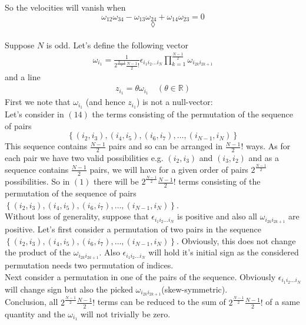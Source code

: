 So the velocities will vanish when$$\omega_{12}\omega_{34}-\omega_{13}\omega_{24}+\omega_{14}\omega_{23}=0$$
$$\lozenge$$\\
Suppose $N$ is odd. Let's define the following vector
\begin{align}
\omega_{i_1}= \frac{1}{2^{\frac{N-1}{2}}\frac{N-1}{2}!}\epsilon_{i_{1} i_{2} \dots i_{N}}\prod_{k=1}^{\frac{N-1}{2}}\omega_{i_{2k} i_{2k+1}}
\end{align}
and a line
\begin{align}
z_{i_1} = \theta \omega_{i_1}\quad (\theta \in \mathbb{R})
\end{align}
First we note that $\omega_{i_1}$ (and hence $z_{i_1}$) is not a null-vector:\\
Let's consider in $(14)$ the terms consisting of the permutation of the sequence of pairs $$\left\{\left( i_2,i_3 \right),\left( i_4,i_5 \right),\left( i_6,i_7\right),\dots ,\left( i_{N-1},i_N \right)\right\}$$ This sequence contains $\frac{N-1}{2}$ pairs and so can be arranged in $\frac{N-1}{2}!$ ways. As for each pair we have two valid possibilities e.g. $\left( i_2,i_3 \right)$ and $\left( i_3,i_2 \right)$ and as a sequence contains $\frac{N-1}{2}$ pairs, we will have for a given order of pairs $2^{\frac{N-1}{2}}$ possibilities. So in $(1)$ there will be $2^{\frac{N-1}{2}}\frac{N-1}{2}!$ terms consisting of the permutation of the sequence of pairs $\left\{\left( i_2,i_3 \right),\left( i_4,i_5 \right),\left( i_6,i_7\right),\dots ,\left( i_{N-1},i_N \right)\right\}$.\\
Without loss of generality, suppose that $\epsilon_{i_{1} i_{2} \dots i_{N}}$ is positive and also all $\omega_{i_{2k} i_{2k+1}}$ are positive.
Let's first consider a permutation of two pairs in the sequence $\left\{\left( i_2,i_3 \right),\left( i_4,i_5 \right),\left( i_6,i_7\right),\dots ,\left( i_{N-1},i_N \right)\right\}$. Obviously, this does not change the product of the $\omega_{i_{2k} i_{2k+1}}$. Also $\epsilon_{i_{1} i_{2} \dots i_{N}}$ will hold it's initial sign as the considered permutation needs two permutation of indices.\\
Next consider a permutation in one of the pairs of the sequence. Obviously $\epsilon_{i_{1} i_{2} \dots i_{N}}$ will change sign but also the picked $\omega_{i_{2k} i_{2k+1}}$(skew-symmetric). \\
Conclusion, all $2^{\frac{N-1}{2}}\frac{N-1}{2}!$ terms can be reduced to the sum of $2^{\frac{N-1}{2}}\frac{N-1}{2}!$ of a same quantity and the  $\omega_{i_1}$ will not trivially be zero.\\
